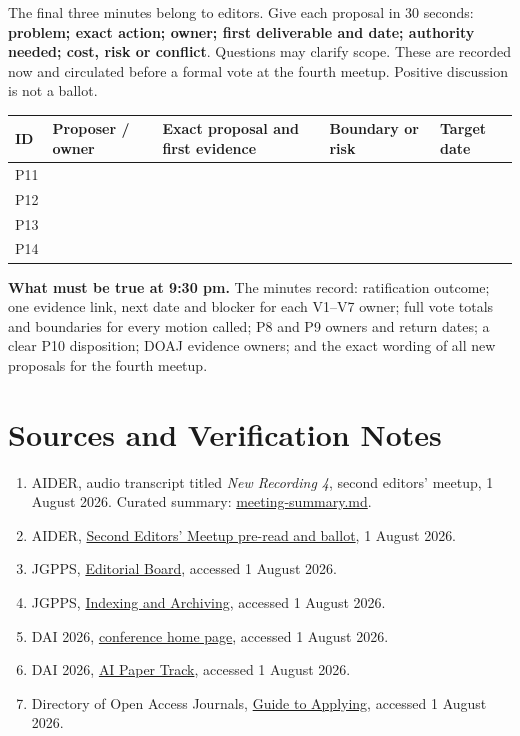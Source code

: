 \documentclass[11pt]{article}
\begin{document}
The final three minutes belong to editors. Give each proposal in 30 seconds: \textbf{problem; exact action; owner; first deliverable and date; authority needed; cost, risk or conflict}. Questions may clarify scope. These are recorded now and circulated before a formal vote at the fourth meetup. Positive discussion is not a ballot.

{\footnotesize\renewcommand{\arraystretch}{1.2}
\begin{longtable}{@{}p{0.85cm}p{2.25cm}p{5.2cm}p{2.8cm}p{2.9cm}@{}}
\toprule
\textbf{ID} & \textbf{Proposer / owner} & \textbf{Exact proposal and first evidence} & \textbf{Boundary or risk} & \textbf{Target date} \\
\midrule
\endhead
\bottomrule
\endlastfoot
P11 & & & & \\[22pt]
P12 & & & & \\[22pt]
P13 & & & & \\[22pt]
P14 & & & & \\[22pt]
\end{longtable}}

\begin{solvebox}
\textbf{What must be true at 9:30 pm.} The minutes record: ratification outcome; one evidence link, next date and blocker for each V1--V7 owner; full vote totals and boundaries for every motion called; P8 and P9 owners and return dates; a clear P10 disposition; DOAJ evidence owners; and the exact wording of all new proposals for the fourth meetup.
\end{solvebox}

\section*{Sources and Verification Notes}

{\footnotesize
\begin{enumerate}
  \item AIDER, audio transcript titled \emph{New Recording 4}, second editors' meetup, 1 August 2026. Curated summary: \href{https://github.com/ai-driven-energy-research/ai-driven-energy-research.github.io/blob/main/meeting-briefings/2026-08-01-doaj-readiness/meeting-summary.md}{meeting-summary.md}.
  \item AIDER, \href{https://ai-driven-energy-research.github.io/aider-second-editors-meetup-pre-read-2026-08-01.pdf}{Second Editors' Meetup pre-read and ballot}, 1 August 2026.
  \item JGPPS, \href{https://journal.gpps.global/Editorial-Board,1801.html}{Editorial Board}, accessed 1 August 2026.
  \item JGPPS, \href{https://journal.gpps.global/Indexing-and-Archiving,1813.html}{Indexing and Archiving}, accessed 1 August 2026.
  \item DAI 2026, \href{https://www.adai.ai/dai/2026/}{conference home page}, accessed 1 August 2026.
  \item DAI 2026, \href{https://www.adai.ai/dai/2026/ai-paper-track.html}{AI Paper Track}, accessed 1 August 2026.
  \item Directory of Open Access Journals, \href{https://doaj.org/apply/guide/}{Guide to Applying}, accessed 1 August 2026.
\end{enumerate}
}
\end{document}
